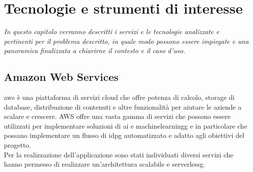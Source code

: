 \chapter{Tecnologie e strumenti di interesse}
\label{cap:tecnologie}
\emph{In questo capitolo verranno descritti i servizi e le tecnologie analizzate e pertinenti per il problema descritto, in quale modo possono essere impiegate e una panoramica finalizzata a chiarirne il contesto e il caso d'uso.}

\section{Amazon Web Services}
\gls{aws} è una piattaforma di servizi cloud che offre potenza di calcolo, storage di database, distribuzione di contenuti e altre funzionalità per aiutare le aziende a scalare e crescere. AWS offre una vasta gamma di servizi che possono essere utilizzati per implementare soluzioni di \gls{ai} e \gls{machinelearningg} e in particolare che possano implementare un flusso di \gls{idpg} automatizzato e adatto agli obiettivi del progetto.\\
Per la realizzazione dell'applicazione sono stati individuati diversi servizi che hanno permesso di realizzare un'architettura scalabile e \gls{serverlessg}.


